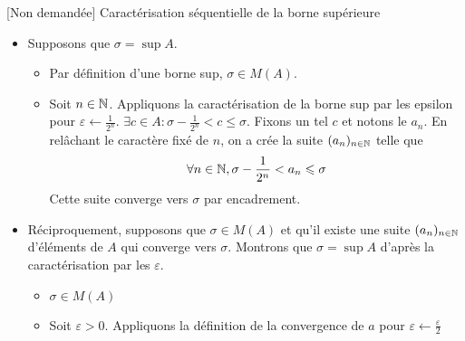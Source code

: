 \documentclass{article}
\renewenvironment{question_kholle}[2][ ]
{
	\subsection{\texorpdfstring{#2}{}}
	\notblank{#1}
	{
		\noindent #1
		\bigbreak
	}
	{}
	\begin{proof}
}
{
	\end{proof}
}
\begin{document}
\begin{question_kholle}[{Soit $A
					\in \mathcal{P}(\R)$ non vide
				et majorée. Soit $\sigma \in \R$
				$$
					\sigma = \sup A \iff \left\{
					\begin{array}{ll}
						\sigma \in M(A) \\
						\exists (a_{n})_{n \in
							\N} \in A^{\N} : \lim_{n
							\to +\infty} a_n = \sigma
					\end{array}\right.
				$$
			}]{[Non demandée]
		Caractérisation séquentielle de
		la borne supérieure}
	\begin{itemize}[label=$\star$]
		\item Supposons que $\sigma = \sup A$.
		      \begin{itemize}[label=$\bullet$]
			      \item Par définition
			            d'une borne sup,
			            $\sigma \in M(A)$.
			      \item Soit $n \in \mathbb N$.
			            Appliquons la
			            caractérisation de la
			            borne sup par les
			            epsilon pour
			            $\varepsilon \leftarrow
				            \frac{1}{2^{n}}$.
			            $\exists c \in A :
				            \sigma -
				            \frac{1}{2^{n}} < c
				            \leqslant \sigma$.
			            Fixons un tel $c$ et
			            notons le $a_{n}$. En
			            relâchant le caractère
			            fixé de $n$, on a crée
			            la suite $(a_{n})_{n
						            \in \mathbb N}$ telle que
			            $$
				            \forall n \in \mathbb N,
				            \sigma -
				            \frac{1}{2^{n}} <
				            a_{n}\leqslant \sigma
			            $$
			            Cette suite converge
			            vers $\sigma$ par encadrement.
		      \end{itemize}
		\item Réciproquement,
		      supposons que $\sigma \in
			      M(A)$ et qu'il existe une
		      suite $(a_{n})_{n \in \mathbb N}$
		      d'éléments de $A$ qui
		      converge vers $\sigma$.
		      Montrons que $\sigma = \sup
			      A$ d'après la
		      caractérisation par les $\varepsilon$.
		      \begin{itemize}[label=$\bullet$]
			      \item$\sigma \in M(A)$
			      \item Soit
			            $\varepsilon>0$.
			            Appliquons la
			            définition de la
			            convergence de $a$ pour
			            $\varepsilon \leftarrow
				            \frac{\varepsilon}{2}$


\end{itemize}
\end{itemize}
\end{question_kholle}
\end{document}

